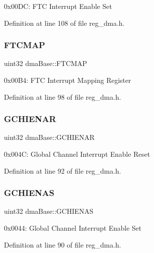 0x00\+DC\+: F\+TC Interrupt Enable Set 

Definition at line 108 of file reg\+\_\+dma.\+h.

\mbox{\label{structdmaBase_abf994c235d889db09d845f5b3571e965}} 
\subsubsection{\texorpdfstring{F\+T\+C\+M\+AP}{FTCMAP}}
{\footnotesize\ttfamily uint32 dma\+Base\+::\+F\+T\+C\+M\+AP}

0x00\+B4\+: F\+TC Interrupt Mapping Register 

Definition at line 98 of file reg\+\_\+dma.\+h.

\mbox{\label{structdmaBase_a14f6297e6b610c85af74b7466e628e6b}} 
\subsubsection{\texorpdfstring{G\+C\+H\+I\+E\+N\+AR}{GCHIENAR}}
{\footnotesize\ttfamily uint32 dma\+Base\+::\+G\+C\+H\+I\+E\+N\+AR}

0x004C\+: Global Channel Interrupt Enable Reset 

Definition at line 92 of file reg\+\_\+dma.\+h.

\mbox{\label{structdmaBase_a6f705c0af0825d0d8ca1f8504fcd75fb}} 
\subsubsection{\texorpdfstring{G\+C\+H\+I\+E\+N\+AS}{GCHIENAS}}
{\footnotesize\ttfamily uint32 dma\+Base\+::\+G\+C\+H\+I\+E\+N\+AS}

0x0044\+: Global Channel Interrupt Enable Set 

Definition at line 90 of file reg\+\_\+dma.\+h.

\mbox{\label{structdmaBase_a0c963aeeac54209e04b6ab92ba7bb3eb}} 
